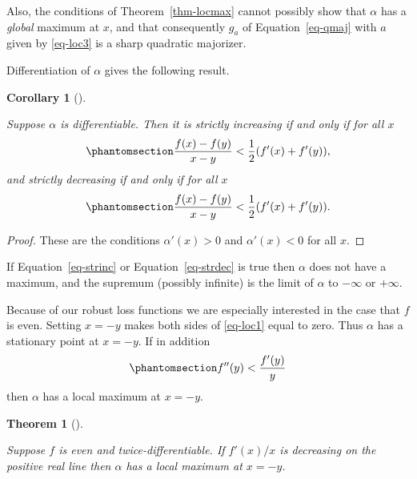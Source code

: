 \documentclass[
  12pt,
  letterpaper,
  DIV=11,
  numbers=noendperiod]{scrartcl}
\theoremstyle{definition}
\theoremstyle{plain}
\theoremstyle{plain}
\newtheorem{theorem}{Theorem}[section]
\theoremstyle{plain}
\newtheorem{corollary}{Corollary}[section]
\theoremstyle{definition}
\theoremstyle{remark}
\begin{document}
Also, the conditions of Theorem~\ref{thm-locmax} cannot possibly show
that \(\alpha\) has a \emph{global} maximum at \(x\), and that
consequently \(g_a\) of Equation~\ref{eq-qmaj} with \(a\) given by
\eqref{eq-loc3} is a sharp quadratic majorizer.

Differentiation of \(\alpha\) gives the following result.

\begin{corollary}[]\protect\hypertarget{cor-incdec}{}\label{cor-incdec}

Suppose \(\alpha\) is differentiable. Then it is strictly increasing if
and only if for all \(x\)
\begin{equation}\phantomsection\label{eq-strinc}{
\frac{f(x)-f(y)}{x-y}<\frac12(f'(x)+f'(y)),
}\end{equation} and strictly decreasing if and only if for all \(x\)
\begin{equation}\phantomsection\label{eq-strdec}{
\frac{f(x)-f(y)}{x-y}<\frac12(f'(x)+f'(y)).
}\end{equation}

\end{corollary}

\begin{proof}
These are the conditions \(\alpha'(x)>0\) and \(\alpha'(x)<0\) for all
\(x\).
\end{proof}

If Equation~\ref{eq-strinc} or Equation~\ref{eq-strdec} is true then
\(\alpha\) does not have a maximum, and the supremum (possibly infinite)
is the limit of \(\alpha\) to \(-\infty\) or \(+\infty\).

Because of our robust loss functions we are especially interested in the
case that \(f\) is even. Setting \(x=-y\) makes both sides of
\eqref{eq-loc1} equal to zero. Thus \(\alpha\) has a stationary point at
\(x=-y\). If in addition \begin{equation}\phantomsection\label{eq-miny}{
f''(y)<\frac{f'(y)}{y}
}\end{equation} then \(\alpha\) has a local maximum at \(x=-y\).

\begin{theorem}[]\protect\hypertarget{thm-evena}{}\label{thm-evena}

Suppose \(f\) is even and twice-differentiable. If \(f'(x)/x\) is
decreasing on the positive real line then \(\alpha\) has a local maximum
at \(x=-y\).

\end{theorem}
\end{document}
